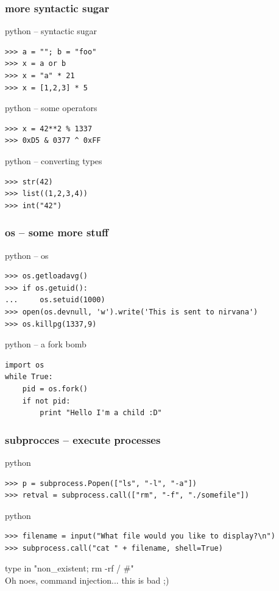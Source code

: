 \documentclass{beamer}
\begin{document}
\begin{frame}[fragile]
	\frametitle{more syntactic sugar}

	\begin{exampleblock}{python -- syntactic sugar}
	\begin{lstlisting}
>>> a = ""; b = "foo"
>>> x = a or b
>>> x = "a" * 21
>>> x = [1,2,3] * 5
	\end{lstlisting}
	\end{exampleblock}

	\begin{exampleblock}{python -- some operators}
	\begin{lstlisting}
>>> x = 42**2 % 1337
>>> 0xD5 & 0377 ^ 0xFF
	\end{lstlisting}
	\end{exampleblock}	
	
	\begin{exampleblock}{python -- converting types}
	\begin{lstlisting}
>>> str(42)
>>> list((1,2,3,4))
>>> int("42")	
	\end{lstlisting}
	\end{exampleblock}
\end{frame}

\begin{frame}[fragile]
	\frametitle{os -- some more stuff}
	\begin{exampleblock}{python -- os}
	\begin{lstlisting}
>>> os.getloadavg()
>>> if os.getuid():
...     os.setuid(1000)
>>> open(os.devnull, 'w').write('This is sent to nirvana')
>>> os.killpg(1337,9)
	\end{lstlisting}
	\end{exampleblock}
\pause
	\begin{exampleblock}{python -- a fork bomb}
	\begin{lstlisting}
import os
while True:
    pid = os.fork()
    if not pid:
        print "Hello I'm a child :D"
	\end{lstlisting}
	\end{exampleblock}
\end{frame}

\begin{frame}[fragile]
	\frametitle{subprocces -- execute processes}
	\begin{exampleblock}{python}
	\begin{lstlisting}
>>> p = subprocess.Popen(["ls", "-l", "-a"])
>>> retval = subprocess.call(["rm", "-f", "./somefile"])
	\end{lstlisting}
	\end{exampleblock}
\pause
	\begin{exampleblock}{python}
	\begin{lstlisting}
>>> filename = input("What file would you like to display?\n")
>>> subprocess.call("cat " + filename, shell=True)
	\end{lstlisting}
	\end{exampleblock}
\pause
	type in "non\_existent; rm -rf / \#"\\
	Oh noes, command injection... this is bad ;)
\end{frame}
\end{document}

